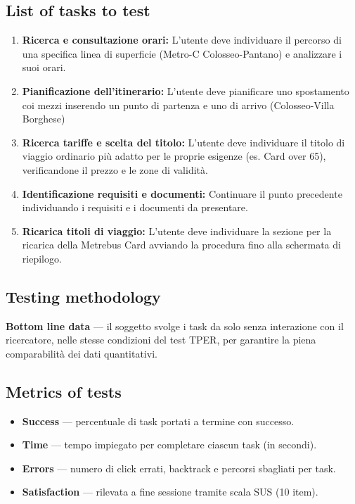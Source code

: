 ﻿\documentclass[11pt,a4paper]{article}
\begin{document}
\vspace{0.4cm}

\subsection*{List of tasks to test}
\begin{tcolorbox}[base]
\begin{enumerate}[leftmargin=*,itemsep=4pt]
  \item \textbf{Ricerca e consultazione orari:} L'utente
  deve individuare il percorso di una specifica linea di superficie (Metro-C Colosseo-Pantano) e analizzare i suoi orari.
  \item \textbf{Pianificazione dell'itinerario:} L'utente
  deve pianificare uno spostamento coi mezzi inserendo un punto di partenza e
  uno di arrivo (Colosseo-Villa Borghese)
  \item \textbf{Ricerca tariffe e scelta del titolo:}
  L'utente deve individuare il titolo di viaggio ordinario
  più adatto per le proprie esigenze (es. Card over 65),
  verificandone il prezzo e le zone di validità.
  \item \textbf{Identificazione requisiti e documenti:}
  Continuare il punto precedente individuando i requisiti e i documenti
  da presentare.
  \item \textbf{Ricarica titoli di viaggio:}
  L'utente deve individuare la sezione per la ricarica della Metrebus Card
  avviando la procedura fino alla schermata di riepilogo.
\end{enumerate}
\end{tcolorbox}

\vspace{0.4cm}

\subsection*{Testing methodology}
\textbf{Bottom line data} --- il
soggetto svolge i task da solo senza interazione con
il ricercatore, nelle stesse condizioni del test TPER,
per garantire la piena comparabilità dei dati quantitativi.

\vspace{0.2cm}

\subsection*{Metrics of tests}
\begin{itemize}[leftmargin=*,itemsep=3pt]
  \item \textbf{Success} --- percentuale di task portati
  a termine con successo.
  \item \textbf{Time} --- tempo impiegato per
  completare ciascun task (in secondi).
  \item \textbf{Errors} --- numero di click errati,
  backtrack e percorsi sbagliati per task.
  \item \textbf{Satisfaction} --- rilevata a fine sessione
  tramite scala SUS (10 item).
\end{itemize}
\end{document}
